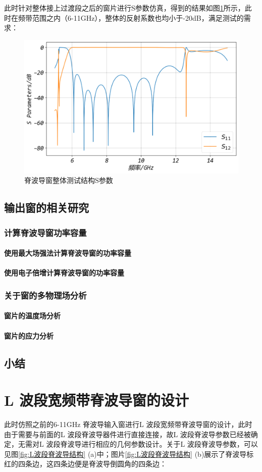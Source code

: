 \documentclass[master]{thesis-uestc}
\begin{document}
此时针对整体接上过渡段之后的窗片进行S参数仿真，得到的结果如图\ref{fig:脊波导窗整体测试结构S参数}所示，此时在频带范围之内（6-11GHz），整体的反射系数也均小于-20dB，满足测试的需求：
\begin{figure}[!htb]
    \centering
    \includegraphics[width=0.5\linewidth]{pic/chapter3/脊波导窗整体S参数.png}
    \caption{脊波导窗整体测试结构S参数}
    \label{fig:脊波导窗整体测试结构S参数}
\end{figure}
\section{输出窗的相关研究}
\subsection{计算脊波导窗功率容量}
\subsubsection{使用最大场强法计算脊波导窗的功率容量}
\subsubsection{使用电子倍增计算脊波导窗的功率容量}
\subsection{关于窗的多物理场分析}
\subsubsection{窗片的温度场分析}
\subsubsection{窗片的应力分析}
\section{小结}
\chapter{L 波段宽频带脊波导窗的设计}
此时仿照之前的6-11GHz 脊波导输入窗进行L 波段宽频带脊波导窗的设计，此时由于需要与前面的L 波段脊波导器件进行直接连接，故L 波段脊波导参数已经被确定，无需对L 波段脊波导进行相应的几何参数设计。关于L 波段脊波导参数，可以见图\ref{fig:L波段脊波导结构} (a)中；图片\ref{fig:L波段脊波导结构} (b)展示了脊波导标红的四条边，这四条边便是脊波导倒圆角的四条边：
\end{document}
